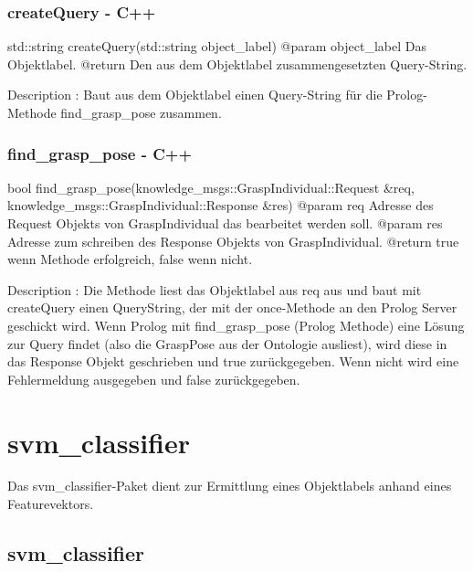 \documentclass{suturo}
\begin{document}
\subsubsection{createQuery - C++}
\begin{spverbatim}
std::string createQuery(std::string object_label)
@param object_label Das Objektlabel.
@return Den aus dem Objektlabel zusammengesetzten Query-String.

Description : Baut aus dem Objektlabel einen Query-String für die 
Prolog-Methode find_grasp_pose zusammen.
\end{spverbatim}

\subsubsection{find\_grasp\_pose - C++}
\begin{spverbatim}
bool find_grasp_pose(knowledge_msgs::GraspIndividual::Request  &req, 
                             knowledge_msgs::GraspIndividual::Response &res)
@param req Adresse des Request Objekts von GraspIndividual das bearbeitet 
           werden soll.
@param res Adresse zum schreiben des Response Objekts von GraspIndividual.
@return true wenn Methode erfolgreich, false wenn nicht.

Description : Die Methode liest das Objektlabel aus req aus und baut mit 
createQuery einen QueryString, der mit der once-Methode an den Prolog Server 
geschickt wird. Wenn Prolog mit find_grasp_pose (Prolog Methode) eine Lösung 
zur Query findet (also die GraspPose aus der Ontologie ausliest), wird diese in 
das Response Objekt geschrieben und true zurückgegeben. Wenn nicht wird 
eine Fehlermeldung ausgegeben und false zurückgegeben.
\end{spverbatim}

\section{svm\_classifier}
Das svm\_classifier-Paket dient zur Ermittlung eines Objektlabels anhand eines Featurevektors.

\subsection{svm\_classifier}
\begin{figure}[!htb]
\end{figure}
\end{document}
